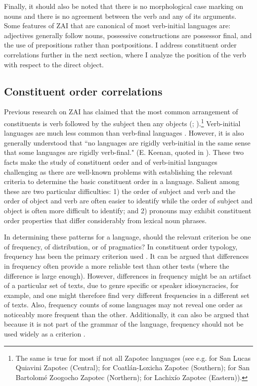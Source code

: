 Finally, it should also be noted that there is no morphological case marking on nouns and there is no agreement between the verb and any of its arguments. Some features of ZAI that are canonical of most verb-initial languages are: adjectives generally follow nouns, possessive constructions are possessor final, and the use of prepositions rather than postpositions. I address constituent order correlations further in the next section, where I analyze the position of the verb with respect to the direct object.



\subsection{Constituent order correlations}\label{odercorrelationssection}

Previous research on ZAI has claimed that the most common arrangement of constituents is verb followed by the subject then any objects (\citealt{pickett1960}; \citealt{pickett1998}).\footnote{The same is true for most if not all Zapotec languages (see e.g. \citet{lee2000} for San Lucas Quiavini Zapotec (Central); \citet{beamdeazcona2004} for Coatl\'{a}n-Loxicha Zapotec (Southern); \citet{sonnenschein2005} for San Bartolom\'{e} Zoogocho Zapotec (Northern); \citet{sicoli2007} for Lachix\'{i}o Zapotec (Eastern)).} Verb-initial languages are much less common than verb-final languages \citep{payne1995}. However, it is also generally understood that ``no languages are rigidly verb-initial in the same sense that some languages are rigidly verb-final." (E. Keenan, quoted in \citet[455]{payne1995}). These two facts make the study of constituent order and of verb-initial languages challenging as there are well-known problems with establishing the relevant criteria to determine the basic constituent order in a language. Salient among these are two particular difficulties: 1) the order of subject and verb and the order of object and verb are often easier to identify while the order of subject and object is often more difficult to identify; and 2) pronouns may exhibit constituent order properties that differ considerably from lexical noun phrases.

In determining these patterns for a language, should the relevant criterion be one of frequency, of distribution, or of pragmatics? In constituent order typology, frequency has been the primary criterion used \citep{dryer2007}. It can be argued that differences in frequency often provide a more reliable test than other tests (where the difference is large enough). However, differences in frequency might be an artifact of a particular set of texts, due to genre specific or speaker idiosyncracies, for example, and one might therefore find very different frequencies in a different set of texts. Also, frequency counts of some languages may not reveal one order as noticeably more frequent than the other. Additionally, it can also be argued that because it is not part of the grammar of the language, frequency should not be used widely as a criterion \citep{dryer2007}.

